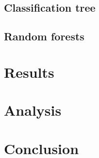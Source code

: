 \documentclass[a4paper,11pt]{article}
\begin{document}
\subsection{Classification tree}
\label{subsec: classificationtree}

\subsection{Random forests}
\label{subsec: randomforests}

\section{Results}

\section{Analysis}

\section{Conclusion}



\end{document}
